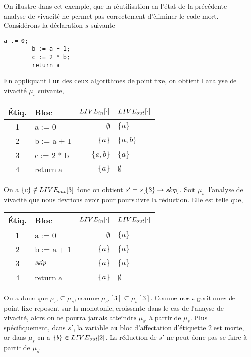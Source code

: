 \documentclass[a4paper, 10pt]{article}
\begin{document}
\begin{example}
	On illustre dans cet exemple, que la réutilisation en l'état de la précédente analyse de vivacité ne permet pas correctement
	d'éliminer le code mort. Considérons la déclaration $s$ suivante.
	\begin{lstlisting}[tabsize=2]
		a := 0;
		b := a + 1;
		c := 2 * b;
		return a
	\end{lstlisting}
	En appliquant l'un des deux algorithmes de point fixe, on obtient l'analyse de vivacité $\mu_s$ suivante,
	\begin{center}
		\begin{tabular}{||c|l|r|l||}
		\hline
		Étiq. & Bloc & $LIVE_{in}[\cdot]$ & $LIVE_{out}[\cdot]$ \\
		\hline
		1 & a := 0 & $\emptyset$ & $\{a\}$\\
		2 & b := a + 1 & $\{a\}$ & $\{a, b\}$\\
		3 & c := 2 * b & $\{a, b\}$ & $\{a\}$\\
		4 & return a & $\{a\}$ & $\emptyset$\\
		\hline
		\end{tabular}
	\end{center}
	On a $\{c\} \notin LIVE_{out}[3]$ donc on obtient $s' = s[\{3\} \rightarrow{ \textit{skip} }]$. Soit $\mu_{s'}$ l'analyse de vivacité
	que nous devrions avoir pour poursuivre la réduction. Elle est telle que,
	\begin{center}
		\begin{tabular}{||c|l|r|l||}
		\hline
		Étiq. & Bloc & $LIVE_{in}[\cdot]$ & $LIVE_{out}[\cdot]$ \\
		\hline
		1 & a := 0 & $\emptyset$ & $\{a\}$\\
		2 & b := a + 1 & $\{a\}$ & $\{a\}$\\
		3 & $\textit{skip}$ & $\{a\}$ & $\{a\}$\\
		4 & return a & $\{a\}$ & $\emptyset$\\
		\hline
		\end{tabular}
	\end{center}
	On a donc que $\mu_{s'} \subseteq \mu_s$, comme $\mu_{s'}[3] \subseteq \mu_s[3]$. Comme nos algorithmes de point fixe reposent
	sur la monotonie, croissante dans le cas de l'anayse de vivacité, alors on ne pourra jamais atteindre $\mu_{s'}$ à partir de $\mu_s$.
	Plus spécifiquement, dans $s'$, la variable au bloc d'affectation d'étiquette $2$ est morte, or dans $\mu_s$ on a $\{b\} \in LIVE_{out}[2]$. 
	La réduction de $s'$ ne peut donc pas se faire à partir de $\mu_s$.	
\end{example}
\end{document}
